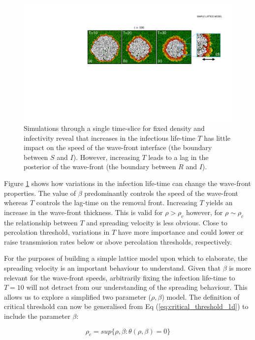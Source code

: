 \begin{figure}
    \centering
    \includegraphics[scale=0.35]{chapter3/figures/figure5_.pdf}
    \caption{Simulations through a single time-slice for fixed density and infectivity reveal that increases in the infectious life-time $T$ has little impact on the speed of the wave-front interface (the boundary between $S$ and $I$). However, increasing $T$ leads to a lag in the posterior of the wave-front (the boundary between $R$ and $I$).}
    \label{fig:slm-wave-front}
\end{figure}

Figure \ref{fig:slm-wave-front} shows how variations in the infection life-time can change the wave-front properties. %
The value of $\beta$ predominantly controls the speed of the  wave-front whereas $T$ controls the lag-time on the removal front. %
Increasing  $T$ yields an  increase in the wave-front thickness. %
This is valid for $\rho > \rho_c$ however, for $\rho \sim \rho_c$ the relationship between $T$ and spreading velocity is less obvious. %
Close to percolation threshold, variations in $T$ have more importance and could lower or raise transmission rates below or above percolation thresholds, respectively. %

For the purposes of building a simple lattice model upon which to elaborate, the spreading velocity is an important behaviour to understand. %
Given that $\beta$ is more relevant for the wave-front speeds, arbitrarily fixing the infection life-time to $T=10$ will not detract from our understanding of the spreading behaviour. %
This allows us to explore a simplified two parameter ($\rho, \beta$) model. %
The definition of critical threshold can now be generalised from Eq (\ref{eq:critical_threshold_1d}) to include the parameter $\beta$: %

\begin{equation}
\label{eq:critical_threshold_1d}
    \rho _{c}=sup \lbrace \rho, \beta : \theta (\rho, \beta ) = 0 \rbrace
\end{equation}

